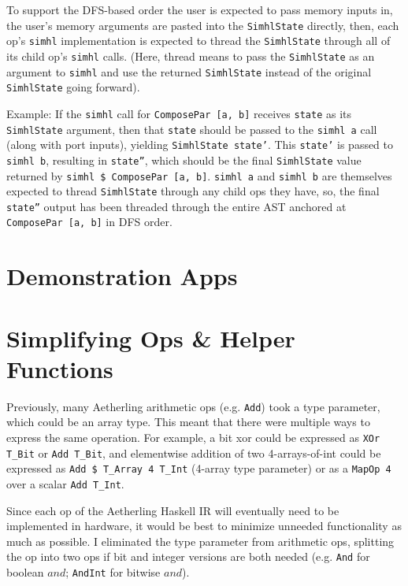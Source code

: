 \documentclass[12pt]{article}
\begin{document}
To support the DFS-based order the user is expected to pass memory
inputs in, the user's memory arguments are pasted into the
\texttt{SimhlState} directly, then, each op's \texttt{simhl}
implementation is expected to thread the \texttt{SimhlState}
through all of its child op's \texttt{simhl} calls. (Here,
thread means to pass the \texttt{SimhlState} as an argument to
\texttt{simhl} and use the returned \texttt{SimhlState} instead
of the original \texttt{SimhlState} going forward).

Example: If the \texttt{simhl} call for \texttt{ComposePar [a, b]}
receives \texttt{state} as its \texttt{SimhlState} argument, then that
\texttt{state} should be passed to the \texttt{simhl a} call (along
with port inputs), yielding \texttt{SimhlState state'}. This
\texttt{state'} is passed to \texttt{simhl b}, resulting in
\texttt{state''}, which should be the final \texttt{SimhlState} value
returned by \texttt{simhl \$ ComposePar [a, b]}. \texttt{simhl a} and
\texttt{simhl b} are themselves expected to thread \texttt{SimhlState}
through any child ops they have, so, the final \texttt{state''} output
has been threaded through the entire AST anchored at
\texttt{ComposePar [a, b]} in DFS order.

\section{Demonstration Apps}


\section{Simplifying Ops \& Helper Functions}

Previously, many Aetherling arithmetic ops (e.g. \texttt{Add}) took a
type parameter, which could be an array type. This meant that there
were multiple ways to express the same operation. For example, a bit
xor could be expressed as \texttt{XOr T\_Bit} or \texttt{Add T\_Bit},
and elementwise addition of two 4-arrays-of-int could be expressed as
\texttt{Add \$ T\_Array 4 T\_Int} (4-array type parameter) or as a
\texttt{MapOp 4} over a scalar \texttt{Add T\_Int}.

Since each op of the Aetherling Haskell IR will eventually need to be
implemented in hardware, it would be best to minimize unneeded
functionality as much as possible. I eliminated the type parameter
from arithmetic ops, splitting the op into two ops if bit and integer
versions are both needed (e.g. \texttt{And} for boolean $and$;
\texttt{AndInt} for bitwise $and$).
\end{document}
